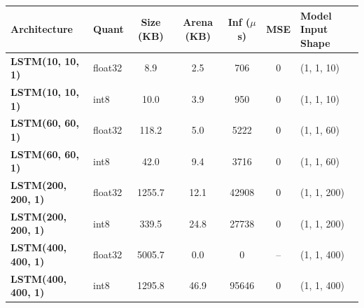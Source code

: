 \begin{tabular}{llccccl}
\toprule
\textbf{Architecture} & Quant & Size (KB) & Arena (KB) & Inf ($\mu$s) & MSE & Model Input Shape \\
\midrule
\textbf{LSTM(10, 10, 1)} & float32 & 8.9 & 2.5 & 706 & 0 & (1, 1, 10) \\
\textbf{LSTM(10, 10, 1)} & int8 & 10.0 & 3.9 & 950 & 0 & (1, 1, 10) \\
\textbf{LSTM(60, 60, 1)} & float32 & 118.2 & 5.0 & 5222 & 0 & (1, 1, 60) \\
\textbf{LSTM(60, 60, 1)} & int8 & 42.0 & 9.4 & 3716 & 0 & (1, 1, 60) \\
\textbf{LSTM(200, 200, 1)} & float32 & 1255.7 & 12.1 & 42908 & 0 & (1, 1, 200) \\
\textbf{LSTM(200, 200, 1)} & int8 & 339.5 & 24.8 & 27738 & 0 & (1, 1, 200) \\
\textbf{LSTM(400, 400, 1)} & float32 & 5005.7 & 0.0 & 0 & -- & (1, 1, 400) \\
\textbf{LSTM(400, 400, 1)} & int8 & 1295.8 & 46.9 & 95646 & 0 & (1, 1, 400) \\
\bottomrule
\end{tabular}

